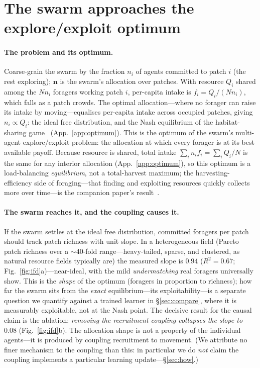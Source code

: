 \documentclass{article}
\begin{document}
\section{The swarm approaches the explore/exploit optimum}
\label{sec:solve}
\paragraph{The problem and its optimum.} Coarse-grain the swarm by the fraction $n_i$ of agents committed to
patch $i$ (the rest exploring); $\mathbf n$ is the swarm's allocation over patches. With resource $Q_i$ shared
among the $N n_i$ foragers working patch $i$, per-capita intake is $f_i=Q_i/(N n_i)$, which falls as a patch
crowds. The optimal allocation---where no forager can raise its intake by moving---equalises per-capita intake
across occupied patches, giving $n_i\propto Q_i$: the ideal free distribution, and the Nash equilibrium of the
habitat-sharing game~\citep{fretwell1969ideal,rosenthal1973congestion} (App.~\ref{app:optimum}). This is the
optimum of the swarm's multi-agent explore/exploit problem: the allocation at which every forager is at its
best available payoff. Because resource is shared, total intake $\sum_i n_i f_i=\sum_i Q_i/N$ is the same for
any interior allocation (App.~\ref{app:optimum}), so this optimum is a load-balancing \emph{equilibrium}, not a
total-harvest maximum; the harvesting-efficiency side of foraging---that finding and exploiting resources
quickly collects more over time---is the companion paper's result~\citep{partI}.

\paragraph{The swarm reaches it, and the coupling causes it.} If the swarm settles at the ideal free
distribution, committed foragers per patch should track patch richness with unit slope. In a heterogeneous
field (Pareto patch richness over a ${\sim}40$-fold range---heavy-tailed, sparse, and clustered, as natural
resource fields typically are) the measured slope is $0.94$ ($R^2=0.67$;
Fig.~\ref{fig:ifd}a)---near-ideal, with the mild \emph{undermatching} real foragers universally show. This is
the \emph{shape} of the optimum (foragers in proportion to richness); how far the swarm sits from the
\emph{exact} equilibrium---its exploitability---is a separate question we quantify against a trained learner in
\S\ref{sec:compare}, where it is measurably exploitable, not at the Nash point. The decisive result for the
causal claim is the ablation: \emph{removing the recruitment coupling collapses the slope to $0.08$}
(Fig.~\ref{fig:ifd}b). The allocation shape is not a property of the individual agents---it is produced by
coupling recruitment to movement. (We attribute no finer mechanism to the coupling than this: in
particular we do \emph{not} claim the coupling implements a particular learning update---\S\ref{sec:how}.)
\end{document}
